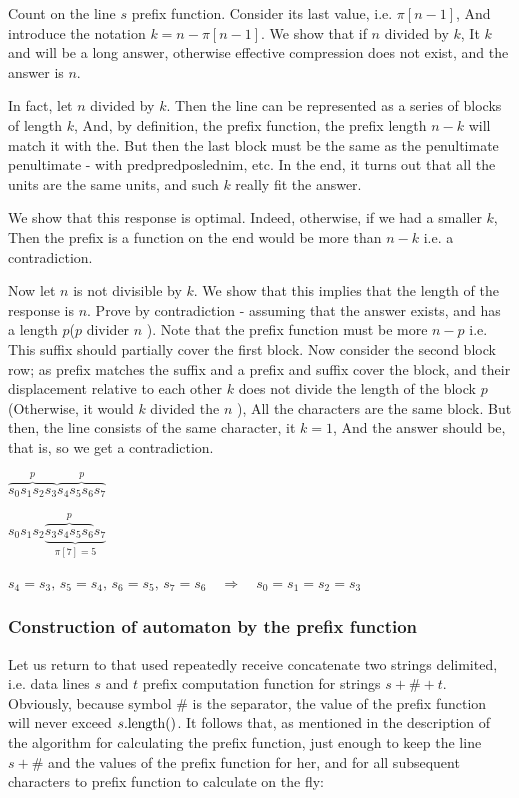 Count on the line $s$ prefix function. Consider its last value, i.e. $\pi [n-1]$, And introduce the notation $k = n - \pi [n-1]$. We show that if $n$ divided by $k$, It $k$ and will be a long answer, otherwise effective compression does not exist, and the answer is $n$.

In fact, let $n$ divided by $k$. Then the line can be represented as a series of blocks of length $k$, And, by definition, the prefix function, the prefix length $n-k$ will match it with the. But then the last block must be the same as the penultimate penultimate - with predpredposlednim, etc. In the end, it turns out that all the units are the same units, and such $k$ really fit the answer.

We show that this response is optimal. Indeed, otherwise, if we had a smaller $k$, Then the prefix is ​​a function on the end would be more than $n-k$ i.e. a contradiction.

Now let $n$ is not divisible by $k$. We show that this implies that the length of the response is $n$. Prove by contradiction - assuming that the answer exists, and has a length $p$($p$ divider $n$ ). Note that the prefix function must be more $n - p$ i.e. This suffix should partially cover the first block. Now consider the second block row; as prefix matches the suffix and a prefix and suffix cover the block, and their displacement relative to each other $k$ does not divide the length of the block $p$ (Otherwise, it would $k$ divided the $n$ ), All the characters are the same block. But then, the line consists of the same character, it $k = 1$, And the answer should be, that is, so we get a contradiction.

$\overbrace{s_{0}s_{1}s_{2}s_{3}}^{p}\overbrace{s_{4}s_{5}s_{6}s_{7}}^{p}$

$s_{0}s_{1}s_{2}\underbrace{\overbrace{s_{3}s_{4}s_{5}s_{6}}^{p}s_{7}}_{\pi[7]=5}$

$s_{4}=s_{3},\, s_{5}=s_{4},\, s_{6}=s_{5},\, s_{7}=s_{6}\quad\Rightarrow\quad s_{0}=s_{1}=s_{2}=s_{3}$

\subsubsection{ Construction of automaton by the prefix function }

Let us return to that used repeatedly receive concatenate two strings delimited, i.e. data lines $s$ and $t$ prefix computation function for strings $s + \# + t$. Obviously, because symbol $\#$ is the separator, the value of the prefix function will never exceed $s. {\rm length}()$. It follows that, as mentioned in the description of the algorithm for calculating the prefix function, just enough to keep the line $s + \#$ and the values ​​of the prefix function for her, and for all subsequent characters to prefix function to calculate on the fly:

